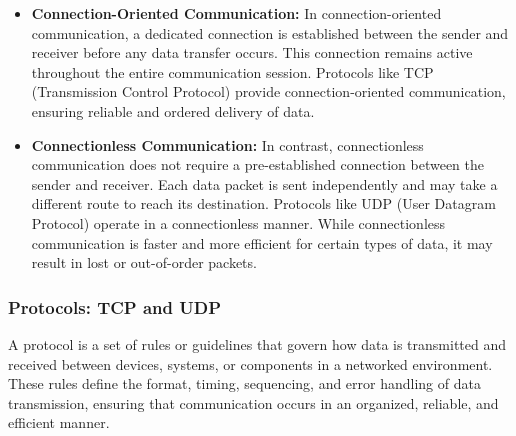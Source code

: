 \begin{itemize}
    \item \textbf{Connection-Oriented Communication:} In connection-oriented communication, a dedicated connection is established between the sender and receiver before any data transfer occurs. This connection remains active throughout the entire communication session. Protocols like TCP (Transmission Control Protocol) provide connection-oriented communication, ensuring reliable and ordered delivery of data.
    
    \item \textbf{Connectionless Communication:} In contrast, connectionless communication does not require a pre-established connection between the sender and receiver. Each data packet is sent independently and may take a different route to reach its destination. Protocols like UDP (User Datagram Protocol) operate in a connectionless manner. While connectionless communication is faster and more efficient for certain types of data, it may result in lost or out-of-order packets.
\end{itemize}

\subsubsection{Protocols: TCP and UDP}
A protocol is a set of rules or guidelines that govern how data is transmitted and received between devices, systems, or components in a networked environment. These rules define the format, timing, sequencing, and error handling of data transmission, ensuring that communication occurs in an organized, reliable, and efficient manner.\\

